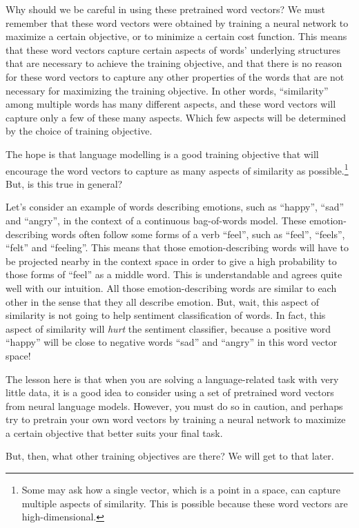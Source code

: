 \documentclass{report}
\begin{document}
Why should we be careful in using these pretrained word vectors? We must
remember that these word vectors were obtained by training a neural network to
maximize a certain objective, or to minimize a certain cost function. This means
that these word vectors capture certain aspects of words' underlying structures
that are necessary to achieve the training objective, and that there is no
reason for these word vectors to capture any other properties of the words that
are not necessary for maximizing the training objective.  In other words,
``similarity'' among multiple words has many different aspects, and these word
vectors will capture only a few of these many aspects. Which few aspects will be
determined by the choice of training objective.

The hope is that language modelling is a good training objective that will
encourage the word vectors to capture as many aspects of similarity as
possible.\footnote{
    Some may ask how a single vector, which is a point in a space, can capture
    multiple aspects of similarity. This is possible because these word vectors
    are high-dimensional.
} But, is this true in general? 

Let's consider an example of words describing emotions, such as ``happy'',
``sad'' and ``angry'', in the context of a continuous bag-of-words model. These
emotion-describing words often follow some forms of a verb ``feel'', such as
``feel'', ``feels'', ``felt'' and ``feeling''. This means that those
emotion-describing words will have to be projected nearby in the context space
in order to give a high probability to those forms of ``feel'' as a middle word.
This is understandable and agrees quite well with our intuition. All those
emotion-describing words are similar to each other in the sense that they all
describe emotion. But, wait, this aspect of similarity is not going to help
sentiment classification of words. In fact, this aspect of similarity will {\em
hurt} the sentiment classifier, because a positive word ``happy'' will be close
to negative words ``sad'' and ``angry'' in this word vector space!

The lesson here is that when you are solving a language-related task with very
little data, it is a good idea to consider using a set of pretrained word
vectors from neural language models. However, you must do so in caution, and
perhaps try to pretrain your own word vectors by training a neural network to
maximize a certain objective that better suits your final task.

But, then, what other training objectives are there? We will get to that later.
\end{document}
